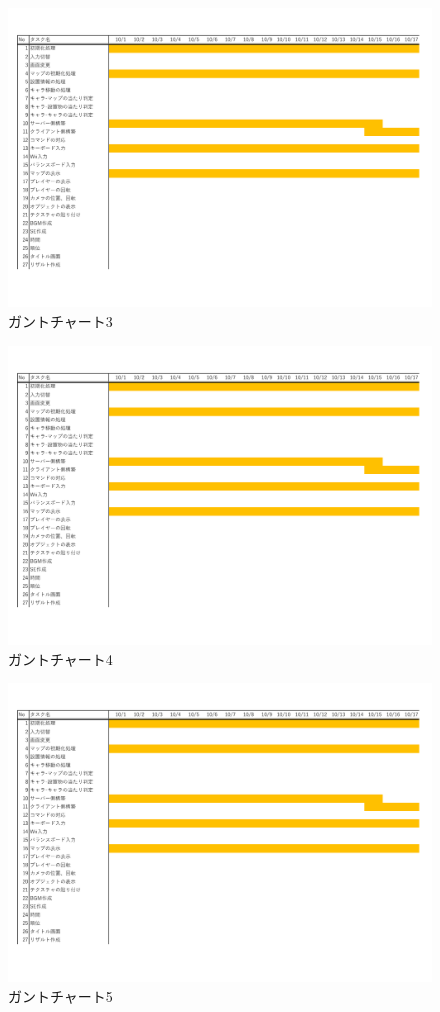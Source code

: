 \documentclass{jarticle}
\begin{document}
\begin{figure}[h]
    \centering
    \label{table:gunt1}
    \caption{ガントチャート3}
    \includegraphics[scale=0.5, page=3]{gunt.pdf}
\end{figure}
\begin{figure}[h]
    \centering
    \label{table:gunt1}
    \caption{ガントチャート4}
    \includegraphics[scale=0.5, page=4]{gunt.pdf}
\end{figure}
\begin{figure}[h]
    \centering
    \label{table:gunt1}
    \caption{ガントチャート5}
    \includegraphics[scale=0.5, page=5]{gunt.pdf}
\end{figure}
\end{document}
